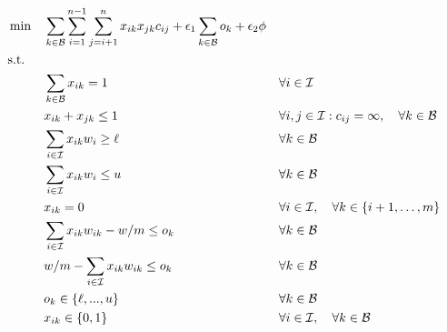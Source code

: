 \documentclass{llncs}
\begin{document}
\begin{align}
  & \min && \sum \limits_{k \in \mathcal{B}} \sum \limits_{i=1}^{n-1} \sum \limits_{j=i+1}^{n} x_{ik}x_{jk}c_{ij} + \epsilon_{1} \sum \limits_{k \in \mathcal{B}} o_{k} + \epsilon_{2} \phi \label{eq:ipa_obj}   \\
  & \textrm{s.t.}                                                                                                                                                                           \notag               \\
  &&& \sum \limits_{k \in \mathcal{B}} x_{ik} = 1                     && \forall i \in \mathcal{I}                                                                                          \label{eq:ipa_cstr1} \\
  &&& x_{ik} + x_{jk} \leq 1                                          && \forall i,j \in \mathcal{I} : c_{ij} = \infty, \quad \forall k \in \mathcal{B}                                     \label{eq:ipa_cstr2} \\
  &&& \sum \limits_{i \in \mathcal{I}} x_{ik} w_{i} \geq \ell         && \forall k \in \mathcal{B}                                                                                          \label{eq:ipa_cstr3} \\
  &&& \sum \limits_{i \in \mathcal{I}} x_{ik} w_{i} \leq u            && \forall k \in \mathcal{B}                                                                                          \label{eq:ipa_cstr4} \\
  &&& x_{ik} = 0                                                      && \forall i \in \mathcal{I}, \quad \forall k \in \{i+1, \dots, m\}                                                   \label{eq:ipa_cstr5} \\
  &&& \sum \limits_{i \in \mathcal{I}} x_{ik} w_{ik} - w/m \leq o_{k} && \forall k \in \mathcal{B}                                                                                          \label{eq:ipa_cstr6} \\
  &&& w/m - \sum \limits_{i \in \mathcal{I}} x_{ik} w_{ik} \leq o_{k} && \forall k \in \mathcal{B}                                                                                          \label{eq:ipa_cstr7} \\
  &&& o_{k} \in \{\ell, ..., u\}                                      && \forall k \in \mathcal{B}                                                                                          \label{eq:ipa_cstr8} \\
  &&& x_{ik} \in \{0, 1\}                                             && \forall i \in \mathcal{I}, \quad \forall k \in \mathcal{B}                                                         \label{eq:ipa_cstr9}
\end{align}
\end{document}
